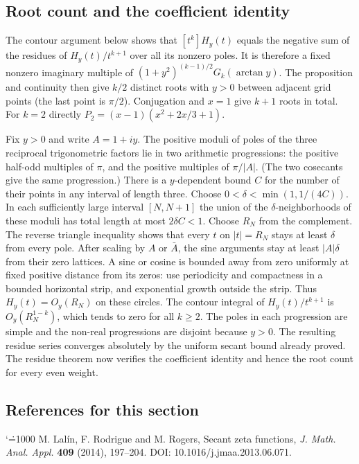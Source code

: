 \documentclass[11pt,a4paper]{article}
\makeatletter
\numberwithin{equation}{section}
\theoremstyle{definition}
\theoremstyle{remark}
\renewenvironment{thebibliography}[1]
 {\subsection*{References for this section}\small
  \list{\@biblabel{\@arabic\c@enumiv}}
       {\settowidth\labelwidth{\@biblabel{#1}}\leftmargin\labelwidth
        \advance\leftmargin\labelsep\@openbib@code
        \usecounter{enumiv}\let\p@enumiv\@empty
        \renewcommand\theenumiv{\@arabic\c@enumiv}}
  \sloppy\clubpenalty4000\widowpenalty4000\sfcode`\.=1000\relax}
 {\def\@noitemerr{\@latex@warning{Empty bibliography}}\endlist}
\makeatother
\begin{document}
\subsection{Root count and the coefficient identity}
The contour argument below shows that $[t^k]H_y(t)$ equals the negative sum of the residues of $H_y(t)/t^{k+1}$ over all its nonzero poles. It is therefore a fixed nonzero imaginary multiple of $(1+y^2)^{(k-1)/2}G_k(\arctan y)$. The proposition and continuity then give $k/2$ distinct roots with $y>0$ between adjacent grid points (the last point is $\pi/2$). Conjugation and $x=1$ give $k+1$ roots in total. For $k=2$ directly $P_2=(x-1)(x^2+2x/3+1)$.
    
Fix $y>0$ and write $A=1+iy$. The positive moduli of poles of the three reciprocal trigonometric factors lie in two arithmetic progressions: the positive half-odd multiples of $\pi$, and the positive multiples of $\pi/|A|$. (The two cosecants give the same progression.) There is a $y$-dependent bound $C$ for the number of their points in any interval of length three. Choose $0<\delta<\min(1,1/(4C))$. In each sufficiently large interval $[N,N+1]$ the union of the $\delta$-neighborhoods of these moduli has total length at most $2\delta C<1$. Choose $R_N$ from the complement. The reverse triangle inequality shows that every $t$ on $|t|=R_N$ stays at least $\delta$ from every pole. After scaling by $A$ or $\bar A$, the sine arguments stay at least $|A|\delta$ from their zero lattices. A sine or cosine is bounded away from zero uniformly at fixed positive distance from its zeros: use periodicity and compactness in a bounded horizontal strip, and exponential growth outside the strip. Thus $H_y(t)=O_y(R_N)$ on these circles. The contour integral of $H_y(t)/t^{k+1}$ is $O_y(R_N^{1-k})$, which tends to zero for all $k\ge2$. The poles in each progression are simple and the non-real progressions are disjoint because $y>0$. The resulting residue series converges absolutely by the uniform secant bound already proved. The residue theorem now verifies the coefficient identity and hence the root count for every even weight.
\begin{thebibliography}{9}
 M. Lal\'in, F. Rodrigue and M. Rogers, Secant zeta functions, \emph{J. Math. Anal. Appl.} \textbf{409} (2014), 197--204. DOI: 10.1016/j.jmaa.2013.06.071.
\end{thebibliography}

\par\endgroup

\begingroup
\end{document}
